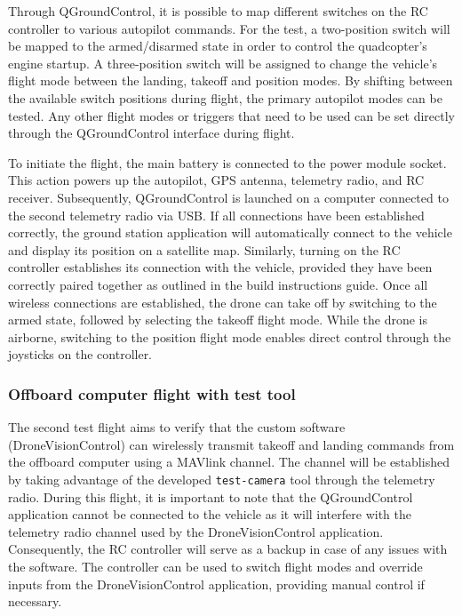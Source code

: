 Through QGroundControl, it is possible to map different switches on the RC controller to various autopilot commands. For the test, a two-position switch will be mapped to the armed/disarmed state in order to control the quadcopter's engine startup. A three-position switch will be assigned to change the vehicle's flight mode between the landing, takeoff and position modes. By shifting between the available switch positions during flight, the primary autopilot modes can be tested. Any other flight modes or triggers that need to be used can be set directly through the QGroundControl interface during flight.


To initiate the flight, the main battery is connected to the power module socket. This action powers up the autopilot, GPS antenna, telemetry radio, and RC receiver. Subsequently, QGroundControl is launched on a computer connected to the second telemetry radio via USB. If all connections have been established correctly, the ground station application will automatically connect to the vehicle and display its position on a satellite map. Similarly, turning on the RC controller establishes its connection with the vehicle, provided they have been correctly paired together as outlined in the build instructions guide. Once all wireless connections are established, the drone can take off by switching to the armed state, followed by selecting the takeoff flight mode. While the drone is airborne, switching to the position flight mode enables direct control through the joysticks on the controller.


\subsubsection{Offboard computer flight with test tool}
\label{subsec:fl-test-2}

The second test flight aims to verify that the custom software (DroneVisionControl) can wirelessly transmit takeoff and landing commands from the offboard computer using a MAVlink channel. The channel will be established by taking advantage of the developed \texttt{test-camera} tool through the telemetry radio. During this flight, it is important to note that the QGroundControl application cannot be connected to the vehicle as it will interfere with the telemetry radio channel used by the DroneVisionControl application. Consequently, the RC controller will serve as a backup in case of any issues with the software. The controller can be used to switch flight modes and override inputs from the DroneVisionControl application, providing manual control if necessary.

